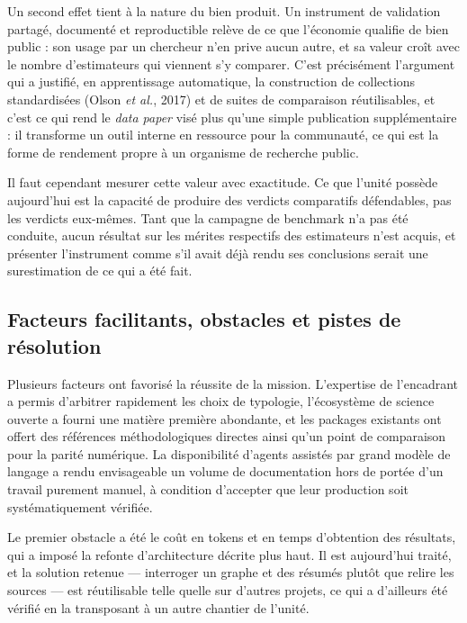\documentclass[11pt,a4paper]{article}
\begin{document}
Un second effet tient à la nature du bien produit. Un instrument de validation partagé, documenté et reproductible relève de ce que l'économie qualifie de bien public : son usage par un chercheur n'en prive aucun autre, et sa valeur croît avec le nombre d'estimateurs qui viennent s'y comparer. C'est précisément l'argument qui a justifié, en apprentissage automatique, la construction de collections standardisées (Olson \textit{et al.}, 2017) et de suites de comparaison réutilisables, et c'est ce qui rend le \textit{data paper} visé plus qu'une simple publication supplémentaire : il transforme un outil interne en ressource pour la communauté, ce qui est la forme de rendement propre à un organisme de recherche public.

Il faut cependant mesurer cette valeur avec exactitude. Ce que l'unité possède aujourd'hui est la capacité de produire des verdicts comparatifs défendables, pas les verdicts eux-mêmes. Tant que la campagne de benchmark n'a pas été conduite, aucun résultat sur les mérites respectifs des estimateurs n'est acquis, et présenter l'instrument comme s'il avait déjà rendu ses conclusions serait une surestimation de ce qui a été fait.

\subsection{Facteurs facilitants, obstacles et pistes de résolution}

Plusieurs facteurs ont favorisé la réussite de la mission. L'expertise de l'encadrant a permis d'arbitrer rapidement les choix de typologie, l'écosystème de science ouverte a fourni une matière première abondante, et les packages existants ont offert des références méthodologiques directes ainsi qu'un point de comparaison pour la parité numérique. La disponibilité d'agents assistés par grand modèle de langage a rendu envisageable un volume de documentation hors de portée d'un travail purement manuel, à condition d'accepter que leur production soit systématiquement vérifiée.

Le premier obstacle a été le coût en tokens et en temps d'obtention des résultats, qui a imposé la refonte d'architecture décrite plus haut. Il est aujourd'hui traité, et la solution retenue --- interroger un graphe et des résumés plutôt que relire les sources --- est réutilisable telle quelle sur d'autres projets, ce qui a d'ailleurs été vérifié en la transposant à un autre chantier de l'unité.
\end{document}
